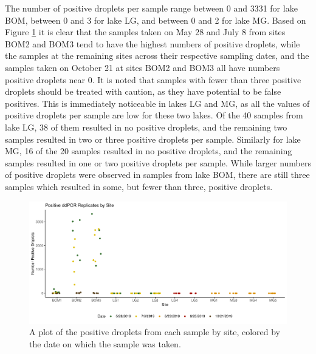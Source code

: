 \documentclass[12pt]{article}\usepackage[]{graphicx}\usepackage[]{color}
\makeatletter
\def\maxwidth{ %
  \ifdim\Gin@nat@width>\linewidth
    \linewidth
  \else
    \Gin@nat@width
  \fi
}
\newenvironment{knitrout}{}{} %
\def\maxwidth{ %
  \ifdim\Gin@nat@width>\linewidth
    \linewidth
  \else
    \Gin@nat@width
  \fi
}
\newenvironment{knitrout}{}{} %
\makeatother
\begin{document}
The number of positive droplets per sample range between 0 and 3331 for lake BOM, between 0 and 3 for lake LG, and between 0 and 2 for lake MG. Based on Figure \ref{fig:eDNA_droplets} it is clear that the samples taken on May 28 and July 8 from sites BOM2 and BOM3 tend to have the highest numbers of positive droplets, while the samples at the remaining sites across their respective sampling dates, and the samples taken on October 21 at sites BOM2 and BOM3 all have numbers positive droplets near 0. It is noted that samples with fewer than three positive droplets should be treated with caution, as they have potential to be false positives. This is immediately noticeable in lakes LG and MG, as all the values of positive droplets per sample are low for these two lakes. Of the 40 samples from lake LG, 38 of them resulted in no positive droplets, and the remaining two samples resulted in two or three positive droplets per sample. Similarly for lake MG, 16 of the 20 samples resulted in no positive droplets, and the remaining samples resulted in one or two positive droplets per sample. While larger numbers of positive droplets were observed in samples from lake BOM, there are still three samples which resulted in some, but fewer than three, positive droplets. 

\begin{figure}[]
\begin{knitrout}
\color{fgcolor}

{\centering \includegraphics[width=\maxwidth]{figure/eDNA_visualization_droplets-1} 

}



\end{knitrout}
\caption{A plot of the positive droplets from each sample by site, colored by the date on which the sample was taken.}
\label{fig:eDNA_droplets}
\end{figure}
\end{document}

